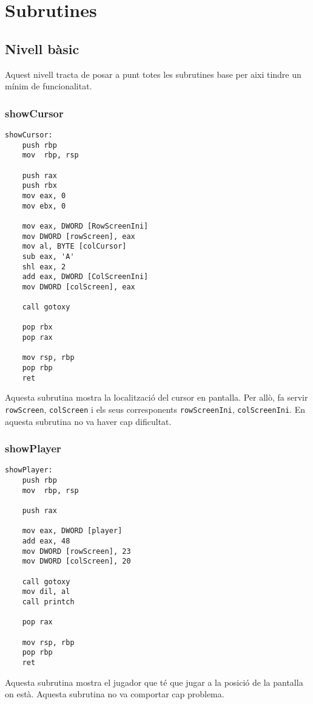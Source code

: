 \documentclass[a4paper,12pt]{article}
\begin{document}
\section{Subrutines} \label{subrut}
\subsection{Nivell bàsic}
Aquest nivell tracta de posar a punt totes les subrutines base per aixi tindre un mínim de funcionalitat.
\subsubsection{showCursor}
\begin{lstlisting}[firstnumber=246]
showCursor:
	push rbp
	mov  rbp, rsp
	
	push rax
	push rbx
	mov eax, 0
	mov ebx, 0

	mov eax, DWORD [RowScreenIni]
	mov DWORD [rowScreen], eax
	mov al, BYTE [colCursor]
	sub eax, 'A'  
	shl eax, 2
	add eax, DWORD [ColScreenIni]
	mov DWORD [colScreen], eax

	call gotoxy

	pop rbx
	pop rax

	mov rsp, rbp
	pop rbp
	ret
\end{lstlisting}
Aquesta subrutina mostra la localització del cursor en pantalla. Per allò, fa servir \lstinline|rowScreen|, \lstinline|colScreen| i els seus corresponents \lstinline|rowScreenIni|, \lstinline|colScreenIni|. En aquesta subrutina no va haver cap dificultat.
\clearpage
\subsubsection{showPlayer}
\begin{lstlisting}[firstnumber=294]
showPlayer:
	push rbp
	mov  rbp, rsp
	
	push rax

	mov eax, DWORD [player]
	add eax, 48  
	mov DWORD [rowScreen], 23
	mov DWORD [colScreen], 20

	call gotoxy
	mov dil, al  	
	call printch

	pop rax

	mov rsp, rbp
	pop rbp
	ret
\end{lstlisting}
Aquesta subrutina mostra el jugador que té que jugar a la posició de la pantalla on està. Aquesta subrutina no va comportar cap problema.
\clearpage
\end{document}
